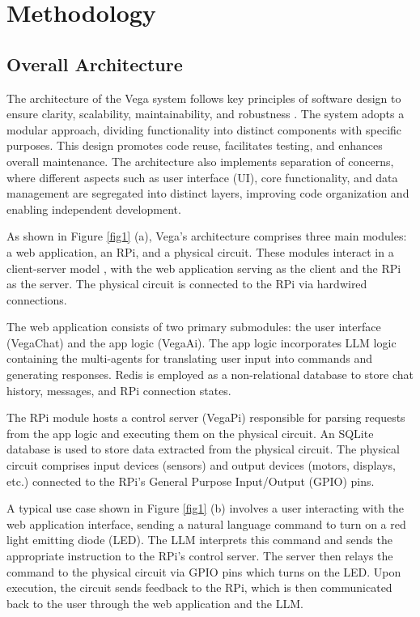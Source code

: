 \documentclass{ieeeaccess}
\begin{document}
\section{Methodology}\label{sec:methodology}

\subsection{Overall Architecture}
The architecture of the Vega system follows key principles of software design to ensure clarity, scalability, maintainability, and robustness \cite{taylor2010software}. The system adopts a modular approach, dividing functionality into distinct components with specific purposes. This design promotes code reuse, facilitates testing, and enhances overall maintenance. The architecture also implements separation of concerns, where different aspects such as user interface (UI), core functionality, and data management are segregated into distinct layers, improving code organization and enabling independent development.

As shown in Figure \ref{fig1} (a), Vega's architecture comprises three main modules: a web application, an RPi, and a physical circuit. These modules interact in a client-server model \cite{tanenbaum2002distributed}, with the web application serving as the client and the RPi as the server. The physical circuit is connected to the RPi via hardwired connections.

The web application consists of two primary submodules: the user interface (VegaChat) and the app logic (VegaAi). The app logic incorporates LLM logic containing the multi-agents for translating user input into commands and generating responses. Redis \cite{6106531} is employed as a non-relational database to store chat history, messages, and RPi connection states.

The RPi module hosts a control server (VegaPi) responsible for parsing requests from the app logic and executing them on the physical circuit. An SQLite database \cite{sqlite} is used to store data extracted from the physical circuit. The physical circuit comprises input devices (sensors) and output devices (motors, displays, etc.) connected to the RPi's General Purpose Input/Output (GPIO) pins.

A typical use case shown in Figure  \ref{fig1} (b) involves a user interacting with the web application interface, sending a natural language command to turn on a red light emitting diode (LED). The LLM interprets this command and sends the appropriate instruction to the RPi's control server. The server then relays the command to the physical circuit via GPIO pins which turns on the LED. Upon execution, the circuit sends feedback to the RPi, which is then communicated back to the user through the web application and the LLM.
\end{document}
